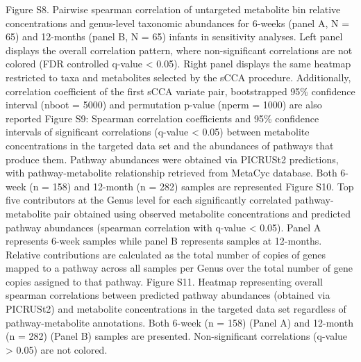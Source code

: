 Figure S8. Pairwise spearman correlation of untargeted metabolite bin relative concentrations and genus-level taxonomic abundances for 6-weeks (panel A, N = 65) and 12-months (panel B, N = 65) infants in sensitivity analyses. Left panel displays the overall correlation pattern, where non-significant correlations are not colored (FDR controlled q-value < 0.05). Right panel displays the same heatmap restricted to taxa and metabolites selected by the sCCA procedure. Additionally, correlation coefficient of the first sCCA variate pair, bootstrapped 95\% confidence interval (nboot = 5000) and permutation p-value (nperm = 1000) are also reported
Figure S9: Spearman correlation coefficients and 95\% confidence intervals of significant correlations (q-value < 0.05) between metabolite concentrations in the targeted data set and the abundances of pathways that produce them. Pathway abundances were obtained via PICRUSt2 predictions, with pathway-metabolite relationship retrieved from MetaCyc database. Both 6-week (n = 158) and 12-month (n = 282) samples are represented
Figure S10. Top five contributors at the Genus level for each significantly correlated pathway-metabolite pair obtained using observed metabolite concentrations and predicted pathway abundances (spearman correlation with q-value < 0.05). Panel A represents 6-week samples while panel B represents samples at 12-months. Relative contributions are calculated as the total number of copies of genes mapped to a pathway across all samples per Genus over the total number of gene copies assigned to that pathway. 
Figure S11. Heatmap representing overall spearman correlations between predicted pathway abundances (obtained via PICRUSt2) and metabolite concentrations in the targeted data set regardless of pathway-metabolite annotations. Both 6-week (n = 158) (Panel A) and 12-month (n = 282) (Panel B) samples are presented. Non-significant correlations (q-value > 0.05) are not colored. 
